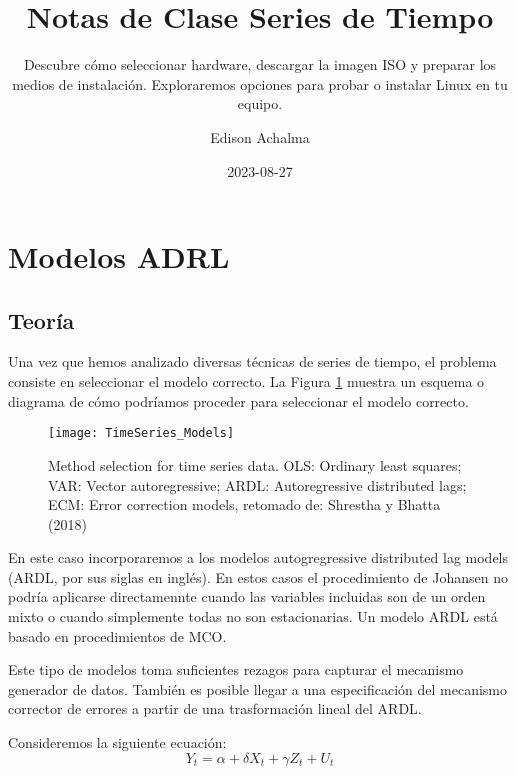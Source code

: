\documentclass[
  a4paper,
]{article}
\title{Notas de Clase Series de Tiempo}
\subtitle{Descubre cómo seleccionar hardware, descargar la imagen ISO y
preparar los medios de instalación. Exploraremos opciones para probar o
instalar Linux en tu equipo.}
\author{Edison Achalma}
\date{2023-08-27}
\begin{document}
\maketitle
\ifdefined\Shaded\renewenvironment{Shaded}{\begin{tcolorbox}[borderline west={3pt}{0pt}{shadecolor}, breakable, interior hidden, frame hidden, sharp corners, boxrule=0pt, enhanced]}{\end{tcolorbox}}\fi

\hypertarget{modelos-adrl}{%
\section{Modelos ADRL}\label{modelos-adrl}}

\hypertarget{teoruxeda}{%
\subsection{Teoría}\label{teoruxeda}}

Una vez que hemos analizado diversas técnicas de series de tiempo, el
problema consiste en seleccionar el modelo correcto. La Figura
\ref{TimeSeries_Models} muestra un esquema o diagrama de cómo podríamos
proceder para seleccionar el modelo correcto.

\begin{figure}
  \centering
    \texttt{[image: TimeSeries\_Models]}
  \caption{ Method selection for time series data. OLS: Ordinary least squares; VAR: Vector autoregressive; ARDL: Autoregressive distributed lags; ECM: Error correction models, retomado de: Shrestha y Bhatta (2018) }
  \label{TimeSeries_Models}
\end{figure}

En este caso incorporaremos a los modelos autogregressive distributed
lag models (ARDL, por sus siglas en inglés). En estos casos el
procedimiento de Johansen no podría aplicarse directamennte cuando las
variables incluidas son de un orden mixto o cuando simplemente todas no
son estacionarias. Un modelo ARDL está basado en procedimientos de MCO.

Este tipo de modelos toma suficientes rezagos para capturar el mecanismo
generador de datos. También es posible llegar a una especificación del
mecanismo corrector de errores a partir de una trasformación lineal del
ARDL.

Consideremos la siguiente ecuación: \[
    Y_t = \alpha + \delta X_t + \gamma Z_t + U_t
    \label{Eq_ARDL}
\]
\end{document}

